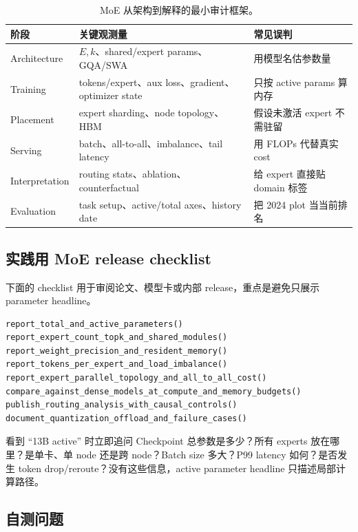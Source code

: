 \documentclass[a4paper]{article}
\begin{document}
\begin{table}[H]
\centering
\small
\begin{tabularx}{\textwidth}{L{0.16\textwidth} L{0.27\textwidth} X}
\toprule
阶段 & 关键观测量 & 常见误判 \\
\midrule
Architecture & $E,k$、shared/expert params、GQA/SWA & 用模型名估参数量 \\
Training & tokens/expert、aux loss、gradient、optimizer state & 只按 active params 算内存 \\
Placement & expert sharding、node topology、HBM & 假设未激活 expert 不需驻留 \\
Serving & batch、all-to-all、imbalance、tail latency & 用 FLOPs 代替真实 cost \\
Interpretation & routing stats、ablation、counterfactual & 给 expert 直接贴 domain 标签 \\
Evaluation & task setup、active/total axes、history date & 把 2024 plot 当当前排名 \\
\bottomrule
\end{tabularx}
\caption{MoE 从架构到解释的最小审计框架。}
\end{table}

\subsection{实践用 MoE release checklist}

下面的 checklist 用于审阅论文、模型卡或内部 release，重点是避免只展示 parameter headline。

\begin{lstlisting}[caption={Sparse MoE release checklist}]
report_total_and_active_parameters()
report_expert_count_topk_and_shared_modules()
report_weight_precision_and_resident_memory()
report_tokens_per_expert_and_load_imbalance()
report_expert_parallel_topology_and_all_to_all_cost()
compare_against_dense_models_at_compute_and_memory_budgets()
publish_routing_analysis_with_causal_controls()
document_quantization_offload_and_failure_cases()
\end{lstlisting}

\begin{warningbox}{看到 “13B active” 时立即追问}
Checkpoint 总参数是多少？所有 experts 放在哪里？是单卡、单 node 还是跨 node？Batch size 多大？P99 latency 如何？是否发生 token drop/reroute？没有这些信息，active parameter headline 只描述局部计算路径。
\end{warningbox}

\subsection{自测问题}
\end{document}
